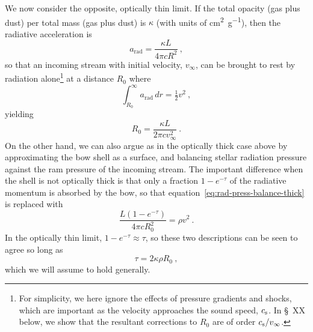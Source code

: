 We now consider the opposite, optically thin limit.  If the total
opacity (gas plus dust) per total mass (gas plus dust) is \(\kappa\) (with
units of \si{cm^2.g^{-1}}), then the radiative acceleration is
\begin{equation}
  \label{eq:rad-accel}
  a_{\text{rad}} = \frac{\kappa L}{4 \pi c R^2} \ , 
\end{equation}
so that an incoming stream with initial velocity, \(v_\infty\), can be
brought to rest by radiation alone\footnote{%
  For simplicity, we here ignore the effects of pressure gradients and
  shocks, which are important as the velocity approaches the sound
  speed, \(c_{\text{s}}\). In \S~XX below, we show that the resultant
  corrections to \(R_0\) are of order \(c_{\text{s}} / v_\infty\).} %
at a distance \(R_0\) where
\begin{equation}
  \label{eq:rad-poten}
  \int_{R_0}^\infty a_{\text{rad}} \, dr = \tfrac12 v^2 \ , 
\end{equation}
yielding
\begin{equation}
  \label{eq:rad:R0}
  R_0 = \frac{\kappa L}{2\pi c v_\infty^2} \ .
\end{equation}
On the other hand, we can also argue as in the optically thick case
above by approximating the bow shell as a surface, and balancing
stellar radiation pressure against the ram pressure of the incoming
stream.  The important difference when the shell is not optically
thick is that only a fraction \(1 - e^{-\tau}\) of the radiative momentum
is absorbed by the bow, so that
equation~\eqref{eq:rad-press-balance-thick} is replaced with
\begin{equation}
  \label{eq:rad-press-balance-tau}
  \frac{L (1 - e^{-\tau})}{4 \pi c R_0^2} = \rho v^2 \ .
\end{equation}
In the optically thin limit, \(1 - e^{-\tau} \approx \tau\), so these two
descriptions can be seen to agree so long as
\begin{equation}
  \label{eq:tau-thin}
  \tau = 2 \kappa \rho R_0 \ ,
\end{equation}
which we will assume to hold generally.


